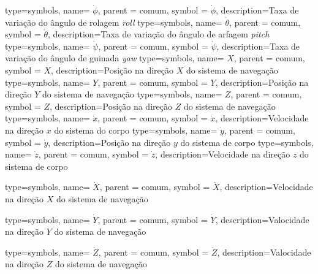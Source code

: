 {type=symbols,
  name= \ensuremath{\dot\phi},
  parent = {comum},
  symbol = \ensuremath{\dot\phi},
  description={Taxa de variação do ângulo de rolagem \emph{roll}}
}
{type=symbols,
  name= \ensuremath{\dot\theta},
  parent = {comum},
  symbol = \ensuremath{\dot\theta},
  description={Taxa de variação do ângulo de arfagem \emph{pitch}}
}
{type=symbols,
  name= \ensuremath{\dot\psi},
  parent = {comum},
  symbol = \ensuremath{\dot\psi},
  description={Taxa de variação do ângulo de guinada \emph{yaw}}
}
{type=symbols,
  name= \ensuremath{X},
  parent = {comum},
  symbol = \ensuremath{X},
  description={Posição na direção \ensuremath{X} do sistema de navegação}
}
{type=symbols,
  name= \ensuremath{Y},
  parent = {comum},
  symbol = \ensuremath{Y},
  description={Posição na direção \ensuremath{Y} do sistema de navegação}
}
{type=symbols,
  name= \ensuremath{Z},
  parent = {comum},
  symbol = \ensuremath{Z},
  description={Posição na direção \ensuremath{Z} do sistema de navegação}
}
{type=symbols,
  name= \ensuremath{\dot{x}},
  parent = {comum},
  symbol = \ensuremath{\dot{x}},
  description={Velocidade na direção \ensuremath{x} do sistema do corpo}
}
{type=symbols,
  name= \ensuremath{\dot{y}},
  parent = {comum},
  symbol = \ensuremath{\dot{y}},
  description={Posição na direção \ensuremath{y} do sistema de corpo}
}
{type=symbols,
  name= \ensuremath{\dot{z}},
  parent = {comum},
  symbol = \ensuremath{\dot{z}},
  description={Velocidade na direção \ensuremath{z} do sistema de corpo}
}

{type=symbols,
  name= \ensuremath{\dot{X}},
  parent = {comum},
  symbol = \ensuremath{\dot{X}},
  description={Velocidade na direção \ensuremath{X} do sistema de navegação}
}

{type=symbols,
  name= \ensuremath{\dot{Y}},
  parent = {comum},
  symbol = \ensuremath{\dot{Y}},
  description={Valocidade na direção \ensuremath{Y} do sistema de navegação}
}

{type=symbols,
  name= \ensuremath{\dot{Z}},
  parent = {comum},
  symbol = \ensuremath{\dot{Z}},
  description={Valocidade na direção \ensuremath{Z} do sistema de navegação}
}


